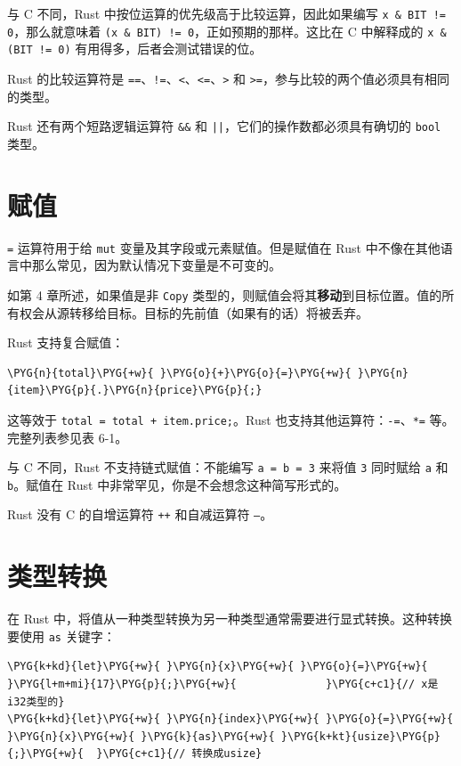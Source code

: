 与 C 不同，Rust 中按位运算的优先级高于比较运算，因此如果编写 \texttt{x \& BIT != 0}，那么就意味着 \texttt{(x \& BIT) != 0}，正如预期的那样。这比在 C 中解释成的 \texttt{x \& (BIT != 0)} 有用得多，后者会测试错误的位。

Rust 的比较运算符是 \texttt{==}、\texttt{!=}、\texttt{<}、\texttt{<=}、\texttt{>} 和 \texttt{>=}，参与比较的两个值必须具有相同的类型。

Rust 还有两个短路逻辑运算符 \texttt{\&\&} 和 \texttt{||}，它们的操作数都必须具有确切的 \texttt{bool} 类型。

\section{赋值}

\texttt{=} 运算符用于给 \texttt{mut} 变量及其字段或元素赋值。但是赋值在 Rust 中不像在其他语言中那么常见，因为默认情况下变量是不可变的。

如第 4 章所述，如果值是非 \texttt{Copy} 类型的，则赋值会将其\textbf{移动}到目标位置。值的所有权会从源转移给目标。目标的先前值（如果有的话）将被丢弃。

Rust 支持复合赋值：

\begin{Verbatim}[commandchars=\\\{\},breaklines=true,breakanywhere=true,fontsize=\codefont,xleftmargin=17bp]
\PYG{n}{total}\PYG{+w}{ }\PYG{o}{+}\PYG{o}{=}\PYG{+w}{ }\PYG{n}{item}\PYG{p}{.}\PYG{n}{price}\PYG{p}{;}
\end{Verbatim}

这等效于 \texttt{total = total + item.price;}。Rust 也支持其他运算符：\texttt{-=}、\texttt{*=} 等。完整列表参见表 6-1。

与 C 不同，Rust 不支持链式赋值：不能编写 \texttt{a = b = 3} 来将值 \texttt{3} 同时赋给 \texttt{a} 和 \texttt{b}。赋值在 Rust 中非常罕见，你是不会想念这种简写形式的。

Rust 没有 C 的自增运算符 \texttt{++} 和自减运算符 \texttt{--}。

\section{类型转换}

在 Rust 中，将值从一种类型转换为另一种类型通常需要进行显式转换。这种转换要使用 \texttt{as} 关键字：

\begin{Verbatim}[commandchars=\\\{\},breaklines=true,breakanywhere=true,fontsize=\codefont,xleftmargin=17bp]
\PYG{k+kd}{let}\PYG{+w}{ }\PYG{n}{x}\PYG{+w}{ }\PYG{o}{=}\PYG{+w}{ }\PYG{l+m+mi}{17}\PYG{p}{;}\PYG{+w}{              }\PYG{c+c1}{// x是i32类型的}
\PYG{k+kd}{let}\PYG{+w}{ }\PYG{n}{index}\PYG{+w}{ }\PYG{o}{=}\PYG{+w}{ }\PYG{n}{x}\PYG{+w}{ }\PYG{k}{as}\PYG{+w}{ }\PYG{k+kt}{usize}\PYG{p}{;}\PYG{+w}{  }\PYG{c+c1}{// 转换成usize}
\end{Verbatim}

